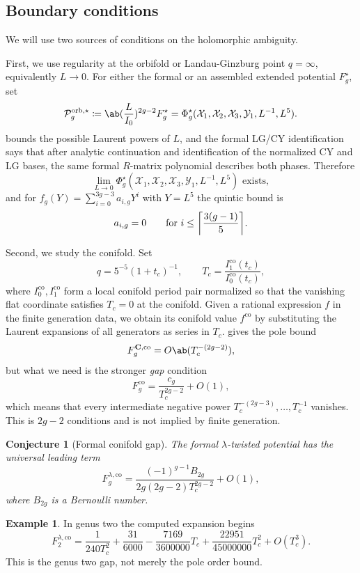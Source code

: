 \documentclass{amsart}
\newtheorem{conj}[thm]{Conjecture}
\theoremstyle{definition}
\newtheorem{exm}[thm]{Example}
\theoremstyle{remark}
\theoremstyle{plain}
\theoremstyle{definition}
\theoremstyle{remark}
\DeclarePairedDelimiter{\ceil}{\lceil}{\rceil}
\newcommand{\mc}[1]{\mathcal{#1}}
\newcommand{\mbf}[1]{\mathbf{#1}}
\newcommand{\mr}[1]{\mathrm{#1}}
\newcommand{\1}{\mathbf{1}}
\newcommand{\2}{\mathbf{2}}
\newcommand{\3}{\mathbf{3}}
\begin{document}
\subsection{Boundary conditions}%
\label{sub:Boundary conditions}

We will use two sources of conditions on the holomorphic ambiguity.

First, we use regularity at the orbifold or Landau-Ginzburg point \(q = \infty\), equivalently \(L \to 0\). For either the formal or an assembled extended potential \(F_g^{\star}\), set
\[ \mc{P}_g^{\mr{orb},\star} \coloneqq \ab(\frac{L}{I_0})^{2g-2}F_g^{\star} = \Phi_g^{\star}(\mc{X}_1,\mc{X}_2,\mc{X}_3,\mc{Y}_1,L^{-1},L^5). \]
 bounds the possible Laurent powers of \(L\), and the formal LG/CY identification says that after analytic continuation and identification of the normalized CY and LG bases, the same formal \(R\)-matrix polynomial describes both phases. Therefore
\[ \lim_{L\to0}\Phi_g^{\star}(\mc{X}_1,\mc{X}_2,\mc{X}_3,\mc{Y}_1,L^{-1},L^5) \text{ exists}, \]
and for \(f_g(Y) = \sum_{i=0}^{3g-3}a_{i,g}Y^i\) with \(Y = L^5\) the quintic bound is
\[ a_{i,g} = 0 \qquad \text{for } i \leq \ceil*{\frac{3(g-1)}{5}}. \]

Second, we study the conifold. Set
\[ q = 5^{-5}(1+t_c)^{-1}, \qquad T_c = \frac{I_1^{\mr{co}}(t_c)}{I_0^{\mr{co}}(t_c)}, \]
where \(I_0^{\mr{co}}, I_1^{\mr{co}}\) form a local conifold period pair normalized so that the vanishing flat coordinate satisfies \(T_c = 0\) at the conifold. Given a rational expression \(f\) in the finite generation data, we obtain its conifold value \(f^{\mr{co}}\) by substituting the Laurent expansions of all generators as series in \(T_c\).  gives the pole bound
\[ F_g^{\mbf{C},\mr{co}} = O\ab(T_c^{-(2g-2)}), \]
but what we need is the stronger \textit{gap} condition
\[ F_g^{\mr{co}} = \frac{c_g}{T_c^{2g-2}} + O(1), \]
which means that every intermediate negative power \(T_c^{-(2g-3)}, \ldots, T_c^{-1}\) vanishes. This is \(2g-2\) conditions and is not implied by finite generation.

\begin{conj}[Formal conifold gap]%
\label{conj:formal conifold gap}
    The formal \(\lambda\)-twisted potential has the universal leading term
    \[ F_g^{\lambda,\mr{co}} = \frac{(-1)^{g-1}B_{2g}}{2g(2g-2)T_c^{2g-2}} + O(1), \]
    where \(B_{2g}\) is a Bernoulli number.
\end{conj}

\begin{exm}
    In genus two the computed expansion begins
    \[ F_2^{\lambda,\mr{co}} = \frac{1}{240T_c^2} + \frac{31}{6000} - \frac{7169}{3600000}T_c + \frac{22951}{45000000}T_c^2 + O(T_c^3). \]
    This is the genus two gap, not merely the pole order bound.
\end{exm}
\end{document}
